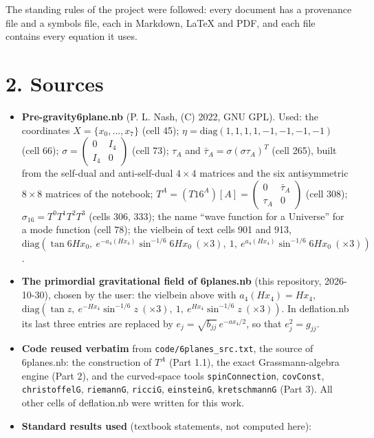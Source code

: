 \documentclass[10pt]{article}
\begin{document}
The standing rules of the project were followed: every document has a provenance file and a symbols file, each in Markdown, LaTeX and PDF, and each file contains every equation it uses.


\section*{2. Sources}

\begin{itemize}
\item \textbf{Pre-gravity6plane.nb} (P. L. Nash, (C) 2022, GNU GPL). Used: the coordinates $X = \{x_0, \dots, x_7\}$ (cell 45); $\eta = \mathrm{diag}(1,1,1,1,-1,-1,-1,-1)$ (cell 66); $\sigma = \begin{pmatrix}0 & I_4\\ I_4 & 0\end{pmatrix}$ (cell 73); $\tau_A$ and $\bar\tau_A = \sigma(\sigma\tau_A)^T$ (cell 265), built from the self-dual and anti-self-dual $4\times4$ matrices and the six antisymmetric $8\times8$ matrices of the notebook; $T^A = (T16^A)[A] = \begin{pmatrix}0 & \bar\tau_A\\ \tau_A & 0\end{pmatrix}$ (cell 308); $\sigma_{16} = T^0T^1T^2T^3$ (cells 306, 333); the name ``wave function for a Universe'' for a mode function (cell 78); the vielbein of text cells 901 and 913, $\mathrm{diag}\left(\tan 6Hx_0,\ e^{-a_4(Hx_4)}\sin^{-1/6}6Hx_0\ (\times3),\ 1,\ e^{a_4(Hx_4)}\sin^{-1/6}6Hx_0\ (\times3)\right)$.
\item \textbf{The primordial gravitational field of 6planes.nb} (this repository, 2026-10-30), chosen by the user: the vielbein above with $a_4(Hx_4) = Hx_4$, $\mathrm{diag}\left(\tan z,\ e^{-Hx_4}\sin^{-1/6}z\ (\times3),\ 1,\ e^{Hx_4}\sin^{-1/6}z\ (\times3)\right)$. In deflation.nb its last three entries are replaced by $e_j = \sqrt{b_{jj}}\,e^{-ax_4/2}$, so that $e_j^2 = g_{jj}$.
\item \textbf{Code reused verbatim} from \texttt{code/6planes\_src.txt}, the source of 6planes.nb: the construction of $T^A$ (Part 1.1), the exact Grassmann-algebra engine (Part 2), and the curved-space tools \texttt{spinConnection}, \texttt{covConst}, \texttt{christoffelG}, \texttt{riemannG}, \texttt{ricciG}, \texttt{einsteinG}, \texttt{kretschmannG} (Part 3). All other cells of deflation.nb were written for this work.
\item \textbf{Standard results used} (textbook statements, not computed here):

\end{itemize}
\end{document}
